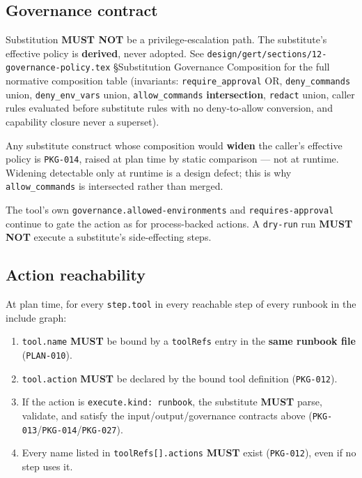 \subsection{Governance contract}
\label{sec:tool-substitution-governance}

Substitution \textbf{MUST NOT} be a privilege-escalation path. The
substitute's effective policy is \textbf{derived}, never adopted. See
\texttt{design/gert/sections/12-governance-policy.tex}
\S Substitution Governance Composition for the full normative composition
table (invariants: \texttt{require\_approval} OR, \texttt{deny\_commands}
union, \texttt{deny\_env\_vars} union, \texttt{allow\_commands}
\textbf{intersection}, \texttt{redact} union, caller rules evaluated before
substitute rules with no deny-to-allow conversion, and capability closure
never a superset).

Any substitute construct whose composition would \textbf{widen} the
caller's effective policy is \texttt{PKG-014}, raised at plan time by static
comparison --- not at runtime. Widening detectable only at runtime is a
design defect; this is why \texttt{allow\_commands} is intersected rather
than merged.

The tool's own \texttt{governance.allowed-environments} and
\texttt{requires-approval} continue to gate the action as for
process-backed actions. A \texttt{dry-run} run \textbf{MUST NOT} execute a
substitute's side-effecting steps.

\subsection{Action reachability}
\label{sec:tool-substitution-reachability}

At plan time, for every \texttt{step.tool} in every reachable step of every
runbook in the include graph:

\begin{enumerate}
  \item \texttt{tool.name} \textbf{MUST} be bound by a \texttt{toolRefs}
        entry in the \textbf{same runbook file} (\texttt{PLAN-010}).
  \item \texttt{tool.action} \textbf{MUST} be declared by the bound tool
        definition (\texttt{PKG-012}).
  \item If the action is \texttt{execute.kind: runbook}, the substitute
        \textbf{MUST} parse, validate, and satisfy the input/output/governance
        contracts above (\texttt{PKG-013}/\texttt{PKG-014}/\texttt{PKG-027}).
  \item Every name listed in \texttt{toolRefs[].actions} \textbf{MUST}
        exist (\texttt{PKG-012}), even if no step uses it.
\end{enumerate}

